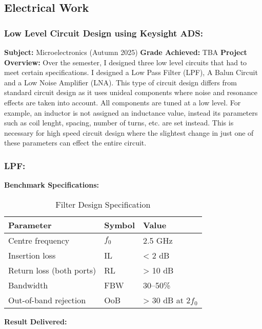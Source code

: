 \subsection{Electrical Work}

\subsubsection{Low Level Circuit Design using Keysight ADS:}
\textbf{Subject: } Microelectronics (Autumn 2025) \newline
\textbf{Grade Achieved: } TBA \newline
\textbf{Project Overview: }
Over the semester, I designed three low level circuits that had to meet certain specifications. I designed a Low Pass Filter (LPF), A Balun Circuit and a Low Noise Amplifier (LNA).
This type of circuit design differs from standard circuit design as it uses unideal components where noise and resonance effects are taken into account. All components are tuned at
a low level. For example, an inductor is not assigned an inductance value, instead its parameters such as coil lenght, spacing, number of turns, etc. are set instead. This is necessary 
for high speed circuit design where the slightest change in just one of these parameters can effect the entire circuit. 

\subsubsection{LPF:}

\textbf{Benchmark Specifications: }

\begin{table}[htbp]
\centering
\begin{tabularx}{\textwidth}{@{} l l X @{}}
\toprule
\textbf{Parameter} & \textbf{Symbol} & \textbf{Value} \\
\midrule
Centre frequency & $f_0$ & 2.5 GHz \\
Insertion loss & IL & < 2 dB \\
Return loss (both ports) & RL & > 10 dB \\
Bandwidth & FBW & 30–50\% \\
Out-of-band rejection & OoB & > 30 dB at $2f_0$ \\
\bottomrule
\end{tabularx}
\caption{Filter Design Specification}
\end{table}

\textbf{Result Delivered: }

